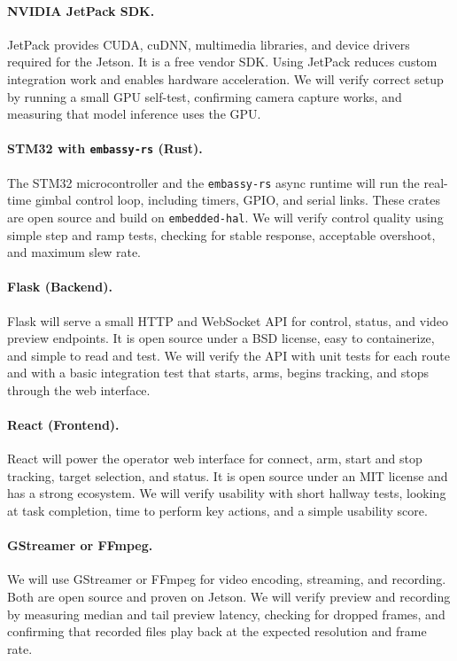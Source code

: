 \documentclass[12pt]{article}
\begin{document}
\paragraph{NVIDIA JetPack SDK.}
JetPack provides CUDA, cuDNN, multimedia libraries, and device drivers required
for the Jetson. It is a free vendor SDK. Using JetPack reduces custom
integration work and enables hardware acceleration. We will verify correct
setup by running a small GPU self-test, confirming camera capture works, and
measuring that model inference uses the GPU.

\paragraph{STM32 with \texttt{embassy-rs} (Rust).}
The STM32 microcontroller and the \texttt{embassy-rs} async runtime will run the real-time gimbal control loop, including timers, GPIO, and serial links. These crates are open source and build on \texttt{embedded-hal}. We will verify control quality using simple step and ramp tests, checking for stable response, acceptable overshoot, and maximum slew rate.

\paragraph{Flask (Backend).}
Flask will serve a small HTTP and WebSocket API for control, status, and video
preview endpoints. It is open source under a BSD license, easy to containerize,
and simple to read and test. We will verify the API with unit tests for each
route and with a basic integration test that starts, arms, begins tracking, and
stops through the web interface.

\paragraph{React (Frontend).}
React will power the operator web interface for connect, arm, start and stop
tracking, target selection, and status. It is open source under an MIT license
and has a strong ecosystem. We will verify usability with short hallway tests,
looking at task completion, time to perform key actions, and a simple usability
score.

\paragraph{GStreamer or FFmpeg.}
We will use GStreamer or FFmpeg for video encoding, streaming, and recording.
Both are open source and proven on Jetson. We will verify preview and recording
by measuring median and tail preview latency, checking for dropped frames, and
confirming that recorded files play back at the expected resolution and frame
rate.
\end{document}
